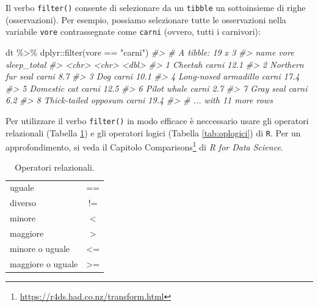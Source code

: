 \documentclass[
  11pt,
]{krantz}
\makeatletter
\newenvironment{Shaded}{\begin{snugshade}}{\end{snugshade}}
\newcommand{\CommentTok}[1]{\textcolor[rgb]{0.37,0.37,0.37}{\textit{#1}}}
\newcommand{\FunctionTok}[1]{\textcolor[rgb]{0,0,0}{#1}}
\newcommand{\NormalTok}[1]{#1}
\newcommand{\SpecialCharTok}[1]{\textcolor[rgb]{0,0,0}{#1}}
\newcommand{\StringTok}[1]{\textcolor[rgb]{0.5,0.5,0.5}{#1}}
\renewcommand{\href}[2]{#2\footnote{\url{#1}}}
\newenvironment{kframe}{%
\medskip{}
\setlength{\fboxsep}{.8em}
 \def\at@end@of@kframe{}%
 \ifinner\ifhmode%
  \def\at@end@of@kframe{\end{minipage}}%
  \begin{minipage}{\columnwidth}%
 \fi\fi%
 \def\FrameCommand##1{\hskip\@totalleftmargin \hskip-\fboxsep
 \colorbox{shadecolor}{##1}\hskip-\fboxsep
     \hskip-\linewidth \hskip-\@totalleftmargin \hskip\columnwidth}%
 \MakeFramed {\advance\hsize-\width
   \@totalleftmargin\z@ \linewidth\hsize
   \@setminipage}}%
 {\par\unskip\endMakeFramed%
 \at@end@of@kframe}
\renewenvironment{Shaded}{\begin{kframe}}{\end{kframe}}
\theoremstyle{definition}
\theoremstyle{definition}
\theoremstyle{definition}
\theoremstyle{definition}
\theoremstyle{remark}
\makeatother
\begin{document}
Il verbo \texttt{filter()} consente di selezionare da un \texttt{tibble} un sottoinsieme di righe (osservazioni). Per esempio, possiamo selezionare tutte le osservazioni nella variabile \texttt{vore} contrassegnate come \texttt{carni} (ovvero, tutti i carnivori):

\begin{Shaded}
\begin{Highlighting}[]
\NormalTok{dt }\SpecialCharTok{\%\textgreater{}\%}
\NormalTok{  dplyr}\SpecialCharTok{::}\FunctionTok{filter}\NormalTok{(vore }\SpecialCharTok{==} \StringTok{"carni"}\NormalTok{)}
\CommentTok{\#\textgreater{} \# A tibble: 19 x 3}
\CommentTok{\#\textgreater{}   name                 vore  sleep\_total}
\CommentTok{\#\textgreater{}   \textless{}chr\textgreater{}                \textless{}chr\textgreater{}       \textless{}dbl\textgreater{}}
\CommentTok{\#\textgreater{} 1 Cheetah              carni        12.1}
\CommentTok{\#\textgreater{} 2 Northern fur seal    carni         8.7}
\CommentTok{\#\textgreater{} 3 Dog                  carni        10.1}
\CommentTok{\#\textgreater{} 4 Long{-}nosed armadillo carni        17.4}
\CommentTok{\#\textgreater{} 5 Domestic cat         carni        12.5}
\CommentTok{\#\textgreater{} 6 Pilot whale          carni         2.7}
\CommentTok{\#\textgreater{} 7 Gray seal            carni         6.2}
\CommentTok{\#\textgreater{} 8 Thick{-}tailed opposum carni        19.4}
\CommentTok{\#\textgreater{} \# ... with 11 more rows}
\end{Highlighting}
\end{Shaded}

Per utilizzare il verbo \texttt{filter()} in modo efficace è neccessario usare gli operatori relazionali (Tabella \ref{tab:oprelazionali}) e gli operatori logici (Tabella \ref{tab:oplogici}) di \texttt{R}. Per un approfondimento, si veda il Capitolo \href{https://r4ds.had.co.nz/transform.html}{Comparisons} di \emph{R for Data Science}.

\begin{table}[h!]
  \begin{center}
    \caption{Operatori relazionali.}
    \label{tab:oprelazionali}
    \begin{tabular}{l c} 
      \toprule
      uguale             &  == \\
      diverso            &  !=  \\
      minore             &  <  \\
      maggiore           &  >  \\
      minore o uguale      & <=  \\
      maggiore o uguale  & >=  \\
      \bottomrule
    \end{tabular}
  \end{center}
\end{table}
\end{document}
